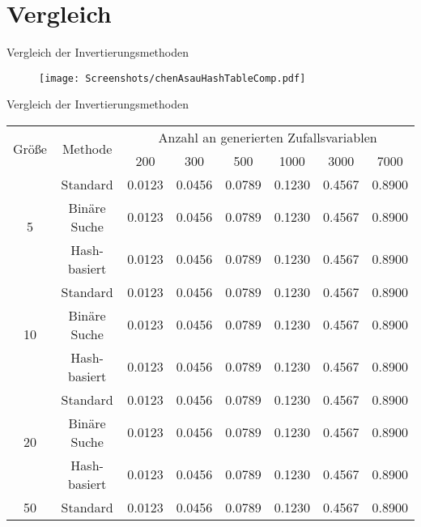 \section{Vergleich}

\begin{frame}{Vergleich der Invertierungsmethoden}
    \begin{figure}
        \centering
        \texttt{[image: Screenshots/chenAsauHashTableComp.pdf]}
        \caption{\cite{chen_asau-generating_random_variates-1974}}
    \end{figure}
\end{frame}

\begin{frame}{Vergleich der Invertierungsmethoden}
    \begin{table}
        \centering
        \begin{tabular}{c|c|c|c|c|c|c|c}
            \multirow{2}{*}{Größe} & \multirow{2}{*}{Methode} & \multicolumn{6}{c}{Anzahl an generierten Zufallsvariablen} \\
            \cline{3-8} & & 200 & 300 & 500 & 1000 & 3000 & 7000 \\
            \hline\hline
            \multirow{3}{*}{5} & Standard & 0.0123 & 0.0456 & 0.0789 & 0.1230 & 0.4567 & 0.8900 \\
            \cline{3-8}[dotted] & Binäre Suche & 0.0123 & 0.0456 & 0.0789 & 0.1230 & 0.4567 & 0.8900 \\
             & Hash-basiert & 0.0123 & 0.0456 & 0.0789 & 0.1230 & 0.4567 & 0.8900 \\
            \hline
            \multirow{3}{*}{10} & Standard & 0.0123 & 0.0456 & 0.0789 & 0.1230 & 0.4567 & 0.8900 \\
             & Binäre Suche & 0.0123 & 0.0456 & 0.0789 & 0.1230 & 0.4567 & 0.8900 \\
             & Hash-basiert & 0.0123 & 0.0456 & 0.0789 & 0.1230 & 0.4567 & 0.8900 \\
            \hline
            \multirow{3}{*}{20} & Standard & 0.0123 & 0.0456 & 0.0789 & 0.1230 & 0.4567 & 0.8900 \\
             & Binäre Suche & 0.0123 & 0.0456 & 0.0789 & 0.1230 & 0.4567 & 0.8900 \\
             & Hash-basiert & 0.0123 & 0.0456 & 0.0789 & 0.1230 & 0.4567 & 0.8900 \\
            \hline
            \multirow{3}{*}{50} & Standard & 0.0123 & 0.0456 & 0.0789 & 0.1230 & 0.4567 & 0.8900 \\

\end{tabular}
\end{table}
\end{frame}
